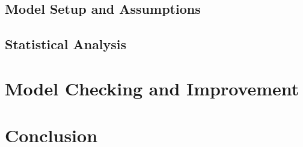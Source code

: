 \documentclass[11pt,notitlepage]{article}
\begin{document}
\subsection{Model Setup and Assumptions}
\label{sec:linearRegressionModelAndAssumptions}


\subsection{Statistical Analysis}
\label{sec:statisticalAnalysisAndInference}






\section{Model Checking and Improvement}
\label{sec:modelChecking}





\section{Conclusion}
\label{sec:conclusion}



\listoftodos

\pagebreak

%
%
\end{document}
